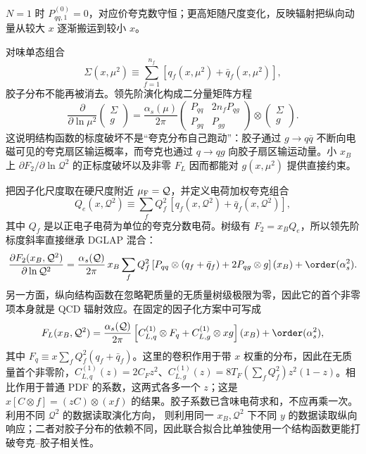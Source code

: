 $N=1$ 时 $P_{qq,1}^{(0)}=0$，对应价夸克数守恒；更高矩随尺度变化，反映辐射把纵向动量从较大 $x$ 逐渐搬运到较小 $x$。

对味单态组合
\begin{equation*}
 \Sigma(x,\mu^2)
 \equiv\sum_{f=1}^{n_f}\left[q_f(x,\mu^2)+\bar q_f(x,\mu^2)\right],
\end{equation*}
胶子分布不能再被消去。领先阶演化构成二分量矩阵方程
\begin{equation}
 {
 \frac{\partial}{\partial\ln\mu^2}
 \begin{pmatrix}\Sigma\\ g\end{pmatrix}
 =\frac{\alpha_s(\mu)}{2\pi}
 \begin{pmatrix}
 P_{qq} & 2n_fP_{qg}\\
 P_{gq} & P_{gg}
 \end{pmatrix}
 \otimes
 \begin{pmatrix}\Sigma\\ g\end{pmatrix}.}
 \label{eq:dis-singlet-gluon-dglap-dp31}
\end{equation}
这说明结构函数的标度破坏不是“夸克分布自己跑动”：胶子通过 $g\to q\bar q$ 不断向电磁可见的夸克扇区输运概率，而夸克也通过 $q\to qg$ 向胶子扇区输运动量。小 $x_B$ 上 $\partial F_2/\partial\ln\mathcal Q^2$ 的正标度破坏以及非零 $F_L$ 因而都能对 $g(x,\mu^2)$ 提供直接约束。

把因子化尺度取在硬尺度附近 $\mu_{\rm F}=\mathcal Q$，并定义电荷加权夸克组合
\begin{equation*}
 Q_e(x,\mathcal Q^2)
 \equiv\sum_f Q_f^2\,[q_f(x,\mathcal Q^2)+\bar q_f(x,\mathcal Q^2)],
\end{equation*}
其中 $Q_f$ 是以正电子电荷为单位的夸克分数电荷。树级有 $F_2=x_BQ_e$，所以领先阶标度斜率直接继承 DGLAP 混合：
\begin{equation}
 {
 \frac{\partial F_2(x_B,\mathcal Q^2)}{\partial\ln\mathcal Q^2}
 =\frac{\alpha_s(\mathcal Q)}{2\pi}\,x_B
 \sum_f Q_f^2\left[
 P_{qq}\otimes(q_f+\bar q_f)
 +2P_{qg}\otimes g
 \right](x_B)
 +\order(\alpha_s^2).}
 \label{eq:dis-f2-scaling-violation-dp32}
\end{equation}
另一方面，纵向结构函数在忽略靶质量的无质量树级极限为零，因此它的首个非零项本身就是 QCD 辐射效应。在固定的因子化方案中可写成
\begin{equation}
 {
 F_L(x_B,\mathcal Q^2)
 =\frac{\alpha_s(\mathcal Q)}{2\pi}
 \left[
 C_{L,q}^{(1)}\otimes F_q
 +C_{L,g}^{(1)}\otimes xg
 \right](x_B)
 +\order(\alpha_s^2),}
 \label{eq:dis-fl-gluon-interface-dp32}
\end{equation}
其中 $F_q\equiv x\sum_f Q_f^2(q_f+\bar q_f)$。这里的卷积作用于带 $x$ 权重的分布，因此在无质量首个非零阶，$C_{L,q}^{(1)}(z)=2C_Fz^2$、$C_{L,g}^{(1)}(z)=8T_F(\sum_fQ_f^2)z^2(1-z)$。相比作用于普通 PDF 的系数，这两式各多一个 $z$；这是 $x[C\otimes f]=(zC)\otimes(xf)$ 的结果。胶子系数已含味电荷求和，不应再乘一次。 利用不同 $\mathcal Q^2$ 的数据读取演化方向， 则利用同一 $x_B,\mathcal Q^2$ 下不同 $y$ 的数据读取纵向响应；二者对胶子分布的依赖不同，因此联合拟合比单独使用一个结构函数更能打破夸克--胶子相关性。

